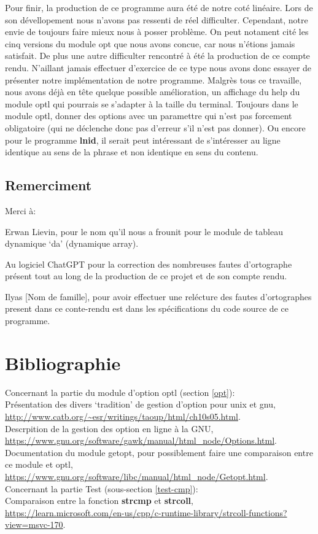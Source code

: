 \documentclass[12pt]{article}
\begin{document}
    Pour finir, la production de ce programme aura été de notre coté linéaire. 
    Lors de son dévellopement nous n'avons pas ressenti de réel difficulter. 
    Cependant, notre envie de toujours faire mieux nous à posser problème. On 
    peut notament cité les cinq versions du module opt que nous avons concue, 
    car nous n'étions jamais satisfait. De plus une autre difficulter rencontré
    à été la production de ce compte rendu. N'aillant jamais effectuer 
    d'exercice de ce type nous avons donc essayer de présenter notre 
    implémentation de notre programme. Malgrès tous ce travaille, nous avons 
    déjà en tête quelque possible amélioration, un affichage du help du module 
    optl qui pourrais se s'adapter à la taille du terminal. Toujours dans le 
    module optl, donner des options avec un paramettre qui n'est pas forcement 
    obligatoire (qui ne déclenche donc pas d'erreur s'il n'est pas donner). Ou 
    encore pour le programme \textbf{lnid}, il serait peut intéressant de 
    s'intéresser au ligne identique au sens de la phrase et non identique en 
    sens du contenu.

    \subsection{Remerciment}

    Merci à: 

    Erwan Lievin, pour le nom qu'il nous a frounit pour le module de tableau 
    dynamique `da' (dynamique array).

    Au logiciel ChatGPT pour la correction des nombreuses fautes d'ortographe 
    présent tout au long de la production de ce projet et de son compte rendu.

    Ilyas [Nom de famille], pour avoir effectuer une relécture des fautes 
    d'ortographes present dans ce conte-rendu est dans les spécifications du 
    code source de ce programme. 

    \newpage

    \section{Bibliographie}
        \noindent Concernant la partie du module d'option optl 
        (section \ref{opt}):\\ Présentation des divers `tradition' de gestion 
        d'option pour unix et gnu, 
        \url{http://www.catb.org/~esr/writings/taoup/html/ch10s05.html}.\\
        Descrpition de la gestion des option en ligne à la GNU, 
        \url{https://www.gnu.org/software/gawk/manual/html_node/Options.html}.\\
        Documentation du module getopt, pour possiblement faire une comparaison 
        entre ce module et optl, 
        \url{https://www.gnu.org/software/libc/manual/html_node/Getopt.html}.\\
        \noindent Concernant la partie Test (sous-section \ref{test-cmp}):\\
        Comparaison entre la fonction \textbf{strcmp} et \textbf{strcoll}, 
        \url{https://learn.microsoft.com/en-us/cpp/c-runtime-library/strcoll-functions?view=msvc-170}.
\end{document}
